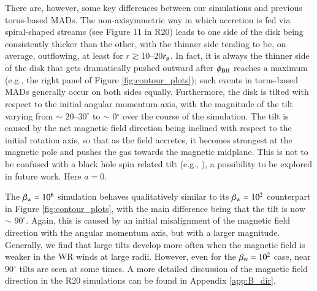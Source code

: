 \documentclass[twocolumn,twocolappendix,apjl,appendixfloats]{aastex63}
\begin{document}
There are, however,  some key differences between our simulations and previous torus-based MADs.  The non-axisymmetric way in which accretion is fed via spiral-shaped streams (see Figure 11 in R20) leads to one side of the disk being consistently thicker than the other, with the thinner side tending to be, on average, outflowing, at least for $r\gtrsim$10--20$r_{\rm g}$.  In fact, it is always the thinner side of the disk that gets dramatically pushed outward after $\phi_{\rm BH}$ reaches a maximum (e.g., the right panel of Figure \ref{fig:contour_plots}); such events in torus-based MADs generally occur on both sides equally. Furthermore, the disk is tilted with respect to the initial angular momentum axis, with the magnitude of the tilt varying from  $\sim$ $20$--$30^\circ$ to $\sim$ 0$^\circ$ over the course of the simulation.   The tilt is caused by the net magnetic field direction being inclined with respect to the initial rotation axis, so that as the field accretes, it becomes strongest at the magnetic pole and pushes the gas towards the magnetic midplane.  This is not to be confused with a black hole spin related tilt (e.g., \citealt{Fragile2005,Liska2018,White2019b}), a possibility to be explored in future work.  Here $a=0$.  

The $\beta_{\rm w}=10^6$ simulation behaves qualitatively similar to its $\beta_{\rm w}=10^2$ counterpart in Figure \ref{fig:contour_plots}, with the main difference being that the tilt is now $\sim$ $90^\circ$.   Again, this is caused by an initial misalignment of the magnetic field direction with the angular momentum axis, but with a larger magnitude.  Generally, we find that large tilts develop more often when the magnetic field is weaker in the WR winds at large radii.  However, even for the $\beta_{\rm w} = 10^2$ case, near 90$^\circ$ tilts are seen at some times. A more detailed discussion of the magnetic field direction in the R20 simulations can be found in Appendix \ref{app:B_dir}.
\end{document}
